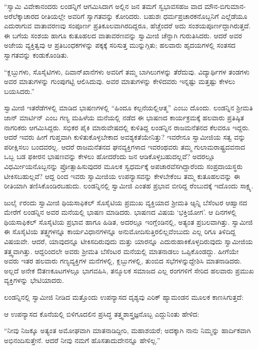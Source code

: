 “ಸ್ವಾಮಿ ವಿವೇಕಾನಂದರು ಲಂಡನ್ನಿಗೆ ಆಗಮಿಸಿದಾಗ ಅಲ್ಲಿನ ಜನ ತಮಗೆ ಸ್ವಭಾವಸಹಜ ವಾದ ಮೌನ-ಬಿಗುಮಾನ-ಅರೆಲೆಕ್ಕಾಚಾರದ ರೀತಿಯಲ್ಲೇ ಅವರಿಗೆ ಸ್ವಾಗತವನ್ನು ಕೋರಿದರು. ಬಹುಶಃ ಧರ್ಮಪ್ರಚಾರಕನೊಬ್ಬನಿಗೆ ಎಲ್ಲೆಡೆಯೂ ಎದುರಾಗುವ ವಾತಾವರಣವು ಸಂಪೂರ್ಣ ಪ್ರತಿಕೂಲವಾಗಿರದಿದ್ದರೂ, ಹೆಚ್ಚೆಂದರೆ ಅದು ಸಂಶಯಪೂರ್ಣದ್ದಾಗಿರುತ್ತದೆ. ಈ ಬಗೆಯ ಸಂಶಯ ಹಾಗೂ ಕುತೂಹಲದ ವಾತಾವರಣವನ್ನು ಸ್ವಾಮೀಜಿ ಚೆನ್ನಾಗಿ ಗುರುತಿಸಿದರು. ಆದರೆ ಅವರ ಅಜೇಯ ವ್ಯಕ್ತಿತ್ವವು ಆ ಪ್ರತಿಬಂಧಕಗಳನ್ನು ಪಕ್ಕಕ್ಕೆ ಸರಿಸುತ್ತ ಮುನ್ನುಗ್ಗಿತು; ಹಲವಾರು ಹೃದಯಗಳಲ್ಲಿ ಸಂತಸದ ಸ್ವಾಗತವನ್ನು ಕಂಡುಕೊಂಡಿತು.

“ಕ್ಲಬ್ಬುಗಳು, ಸೊಸೈಟಿಗಳು, ದಿವಾನ್​ಖಾನೆಗಳು ಅವರಿಗೆ ತಮ್ಮ ಬಾಗಿಲುಗಳನ್ನು ತೆರೆದುವು. ವಿದ್ಯಾರ್ಥಿಗಳ ತಂಡಗಳು ಅವರ ಮಾತುಗಳನ್ನು ಗುಂಪುಗಟ್ಟಿ ಆಲಿಸಿದುವು. ಅವರ ಮಾತುಗಳನ್ನು ಕೇಳಿದವರು ಇನ್ನಷ್ಟು ಮತ್ತಷ್ಟು ಕೇಳಲು ಬಯಸಿದರು.”

ಸ್ವಾಮೀಜಿ ಇತರೆಡೆಗಳಲ್ಲಿ ಮಾಡಿದ ಭಾಷಣಗಳಲ್ಲಿ “ಹಿಂದೂ ಕಲ್ಪನೆಯಲ್ಲಿಆತ್ಮ” ಎಂಬು ದೊಂದು. ಲಂಡನ್ನಿನ ಶ್ರೀಮತಿ ಜಾನ್ ಮಾರ್ಟಿನ್ ಎಂಬ ಗಣ್ಯ ಮಹಿಳೆಯ ಮನೆಯಲ್ಲಿ ನಡೆದ ಈ ಭಾಷಣದ ಕಾರ್ಯಕ್ರಮಕ್ಕೆ ಹಲವಾರು ಪ್ರತಿಷ್ಠಿತ ನಾಗರಿಕರು ಆಗಮಿಸಿದ್ದರು. ಸಭಿಕರ ಪೈಕಿ ಮಾರುವೇಷದಲ್ಲಿ ಕುಳಿತಿದ್ದ ಲಂಡನ್ನಿನ ರಾಜಮನೆತನದ ಕೆಲವರೂ ಇದ್ದರು. ಆದರೆ ಇವರು ಹೀಗೆ ಗುಪ್ತವಾಗಿ ಕುಳಿತುಕೊಳ್ಳಬೇಕಾದ ಅವಶ್ಯಕತೆಯೇನಿತ್ತು? ಇವರೇನೂ ಸ್ವಾಮೀಜಿಯ ಸತ್ವ ವನ್ನು ಪರೀಕ್ಷಿಸಲು ಬಂದವರಲ್ಲ. ಆದರೆ ರಾಜಮನೆತನದ ಘನವ್ಯಕ್ತಿಗಳಾದ ಇವರಂಥವರು ತಮ್ಮ ಗುಲಾಮರಾಷ್ಟ್ರದವನಾದ ಒಬ್ಬ ಬಡ ಫಕೀರನ ಭಾಷಣವನ್ನು ಕೇಳಲು ಹೋದರೆಂದು ಜನ ಆಡಿಕೊಳ್ಳಬಹುದಲ್ಲವೆ? ಅದರಲ್ಲೂ ವಿಧರ್ಮೀಯನೊಬ್ಬನನ್ನು ಪ್ರೋತ್ಸಾಹಿಸುವುದರ ಮೂಲಕ ಸ್ವಧರ್ಮಕ್ಕೆ ಅಪಚಾರವೆಸಗಿದ್ದಾರೆಂದು ಸಂಪ್ರದಾಯಸ್ಥರು ಟೀಕಿಸಬಹುಲ್ಲವೆ? ಆದ್ದ ರಿಂದ ಇವರು ಸ್ವಾಮೀಜಿಯ ಉಪನ್ಯಾಸವನ್ನು ಕೇಳಬೇಕೆಂಬ ತಮ್ಮ ಕುತೂಹಲವನ್ನು ಈ ರೀತಿಯಾಗಿ ತಣಿಸಿಕೊಂಡಿರಬಹುದು. ಲಂಡನ್ನಿನಲ್ಲಿ ಸ್ವಾಮೀಜಿ ಎಂತಹ ಪ್ರಭಾವ ಬೀರಿದ್ದ ರೆಂಬುದಕ್ಕೆ ಇದೊಂದು ಸಾಕ್ಷ್ಯ.

ಜುಲೈ ೯ರಂದು ಸ್ವಾಮೀಜಿ ಥಿಯಸಾಫಿಕಲ್ ಸೊಸೈಟಿಯ ಪ್ರಮುಖ ವ್ಯಕ್ತಿಯಾದ ಶ್ರೀಮತಿ ಆ್ಯನ್ನಿ ಬೆಸೆಂಟರ ಆಹ್ವಾನದ ಮೇರೆಗೆ ಲಂಡನ್ನಿನ ಅವರ ಮನೆಯಲ್ಲಿ ಭಾಷಣ ಮಾಡಿದರು. ಭಾಷಣದ ವಿಷಯ ‘ಭಕ್ತಿಯೋಗ’. ಆ ದಿನಗಳಲ್ಲಿ ಥಿಯಸಾಫಿಕಲ್ ಸೊಸೈಟಿಯ ಪ್ರಭಾವ ಹಾಗೂ ಹಿಡಿತ, ಅದರಲ್ಲೂ ಇಂಗ್ಲೆಂಡಿನಲ್ಲಿ, ಅತ್ಯಂತ ಪ್ರಬಲವಾಗಿತ್ತು. ಸ್ವಾಮೀಜಿ ಈ ಸೊಸೈಟಿಯ ತತ್ತ್ವಗಳನ್ನೂ ಕಾರ್ಯವಿಧಾನಗಳನ್ನೂ ಅನುಮೋದಿಸುತ್ತಿರಲಿಲ್ಲವೆಂಬುದು ಎಲ್ಲ ರಿಗೂ ತಿಳಿದಿದ್ದ ವಿಷಯವೇ. ಆದರೆ, ಯಾವುದನ್ನೂ ಟೀಕಿಸದಿರುವುದು ಮತ್ತು ಯಾರನ್ನೂ ಎದುರುಹಾಕಿಕೊಳ್ಳದಿರುವುದು ಸ್ವಾಮೀಜಿಯ ತತ್ತ್ವವಾಗಿತ್ತು. ಆದ್ದರಿಂದಲೇ ಅವರು ಶ್ರೀಮತಿ ಬೆಸೆಂಟರ ಮನೆಯಲ್ಲಿ ಮಾತನಾಡಲು ಒಪ್ಪಿಕೊಂಡದ್ದು. ಹೀಗೆಯೇ ಅವರು ಇತರ ಹಲವಾರು ಗಣ್ಯವ್ಯಕ್ತಿಗಳ ಮನೆಗಳಲ್ಲಿ, ಕ್ಲಬ್ಬುಗಳಲ್ಲಿ, ತುಂಬಿದ ಸಭೆಗಳನ್ನುದ್ದೇಶಿಸಿ ಮಾತನಾಡಿದರು. ಅಲ್ಲದೆ ಅನೇಕ ಔತಣಕೂಟಗಳಲ್ಲೂ ಭಾಗವಹಿಸಿ, ತನ್ಮೂಲಕ ಸಮಾಜದ ಎಲ್ಲ ರಂಗಗಳಿಗೆ ಸೇರಿದ ಹಲವಾರು ಪ್ರಮುಖ ವ್ಯಕ್ತಿಗಳನ್ನು ಭೇಟಿಯಾದರು.

ಲಂಡನ್ನಿನಲ್ಲಿ ಸ್ವಾಮೀಜಿ ನೀಡಿದ ಮತ್ತೊಂದು ಉಪನ್ಯಾಸದ ದೃಶ್ಯವು ಎರಿಕ್ ಹ್ಯಾಮಂಡನ ಮೂಲಕ ಕಾಣಸಿಗುತ್ತದೆ:

ಆ ಉಪನ್ಯಾಸದ ಕೊನೆಯಲ್ಲಿ ಬಿಳಿಗೂದಲಿನ ಪ್ರಸಿದ್ಧ ತತ್ತ್ವಶಾಸ್ತ್ರಜ್ಞನೊಬ್ಬ ಎದ್ದುನಿಂತು ಹೇಳಿದ:

“ನೀವು ನಿಜಕ್ಕೂ ಅತ್ಯಂತ ಅಮೋಘವಾಗಿ ಮಾತನಾಡಿದ್ದೀರಿ, ಮಹಾಶಯರೆ; ಅದಕ್ಕಾಗಿ ನಾನು ನಿಮ್ಮನ್ನು ಹಾರ್ದಿಕವಾಗಿ ಅಭಿನಂದಿಸುತ್ತೇನೆ. ಆದರೆ ನೀವು ನಮಗೆ ಹೊಸತಾದುದೇನನ್ನೂ ಹೇಳಿಲ್ಲ.”

